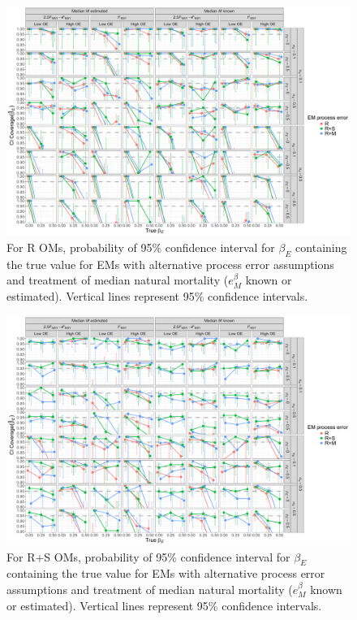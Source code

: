 \documentclass[
  12pt,
]{article}
\begin{document}
\begin{landscape}
\begin{figure}
\begin{center}
\includegraphics[height = \textheight]{beta_E_CI_coverage_Rom}
\end{center}
\caption{For R OMs, probability of 95\% confidence interval for $\beta_E$ containing the true value for EMs with alternative process error assumptions and treatment of median natural mortality ($e^\beta_M$ known or estimated). Vertical lines represent 95\% confidence intervals.}\label{beta_E_CI_coverage_Rom}
\end{figure}
\end{landscape}

\begin{landscape}
\begin{figure}
\begin{center}
\includegraphics[height = \textheight]{beta_E_CI_coverage_RSom}
\end{center}
\caption{For R+S OMs, probability of 95\% confidence interval for $\beta_E$ containing the true value for EMs with alternative process error assumptions and treatment of median natural mortality ($e^\beta_M$ known or estimated). Vertical lines represent 95\% confidence intervals.}\label{beta_E_CI_coverage_RSom}
\end{figure}
\end{landscape}
\end{document}
